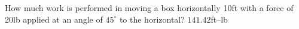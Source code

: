 {How much work is performed in moving a box horizontally 10ft with a force of 20lb applied at an angle of $45^\circ$ to the horizontal?
}
{$141.42$ft--lb
}
